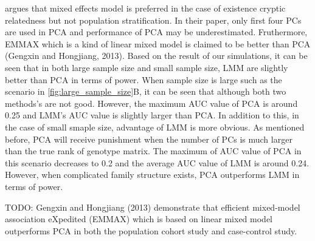 \documentclass[11pt]{article}
\begin{document}

\citet{wang_analytical_2013} argues that mixed effects model is preferred in the case of existence cryptic relatedness but not population stratification.
In their paper, only first four PCs are used in PCA and performance of PCA may be underestimated.
Fruthermore, EMMAX which is a kind of linear mixed model is claimed to be better than PCA (Gengxin and Hongjiang, 2013).
Based on the result of our simulations, it can be seen that in both large sample size and small sample size, LMM are slightly better than PCA in terms of power.
When sample size is large such as the scenario in \cref{fig:large_sample_size}B, it can be seen that although both two methods's are not good.
However, the maximum AUC value of PCA is around 0.25 and LMM's AUC value is slightly larger than PCA.
In addition to this, in the case of small smaple size, advantage of LMM is more obvious.
As mentioned before, PCA will receive punishment when the number of PCs is much larger than the true rank of genotype matrix.
The maximum of AUC value of PCA in this scenario decreases to 0.2 and the average AUC value of LMM is around 0.24.
However, when complicated family structure exists, PCA outperforms LMM in terms of power. 

\citep{tucker_improving_2014}

TODO:
Gengxin and Hongjiang (2013) demonstrate that efficient mixed-model association eXpedited (EMMAX) which is based on linear mixed model outperforms PCA in both the population cohort study and case-control study.


\printbibliography
\end{document}
